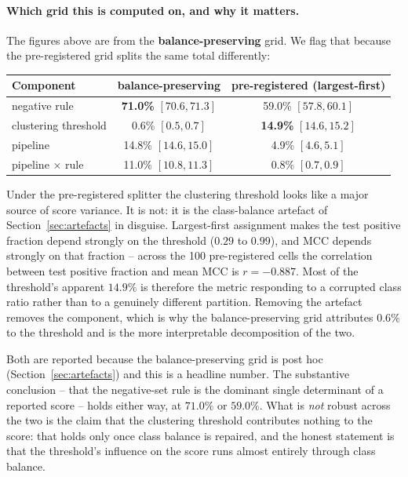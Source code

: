 \documentclass[11pt,a4paper]{article}
\begin{document}
\paragraph{Which grid this is computed on, and why it matters.} The figures above are from
the \textbf{balance-preserving} grid. We flag that because the pre-registered grid splits
the same total differently:

\begin{center}\small
\begin{tabular}{lcc}
\toprule
Component & balance-preserving & pre-registered (largest-first) \\
\midrule
negative rule          & \textbf{71.0\%} $[70.6, 71.3]$ & 59.0\% $[57.8, 60.1]$ \\
clustering threshold   & 0.6\% $[0.5, 0.7]$            & \textbf{14.9\%} $[14.6, 15.2]$ \\
pipeline               & 14.8\% $[14.6, 15.0]$         & 4.9\% $[4.6, 5.1]$ \\
pipeline $\times$ rule & 11.0\% $[10.8, 11.3]$         & 0.8\% $[0.7, 0.9]$ \\
\bottomrule
\end{tabular}
\end{center}

\noindent Under the pre-registered splitter the clustering threshold looks like a major
source of score variance. It is not: it is the class-balance artefact of
Section~\ref{sec:artefacts} in disguise. Largest-first assignment makes the test positive
fraction depend strongly on the threshold ($0.29$ to $0.99$), and MCC depends strongly on
that fraction -- across the 100 pre-registered cells the correlation between test positive
fraction and mean MCC is $r = -0.887$. Most of the threshold's apparent $14.9\%$ is
therefore the metric responding to a corrupted class ratio rather than to a genuinely
different partition. Removing the artefact removes the component, which is why the
balance-preserving grid attributes $0.6\%$ to the threshold and is the more interpretable
decomposition of the two.

Both are reported because the balance-preserving grid is post hoc
(Section~\ref{sec:artefacts}) and this is a headline number. The substantive conclusion --
that the negative-set rule is the dominant single determinant of a reported score -- holds
either way, at $71.0\%$ or $59.0\%$. What is \emph{not} robust across the two is the claim
that the clustering threshold contributes nothing to the score: that holds only once class
balance is repaired, and the honest statement is that the threshold's influence on the
score runs almost entirely through class balance.
\end{document}
